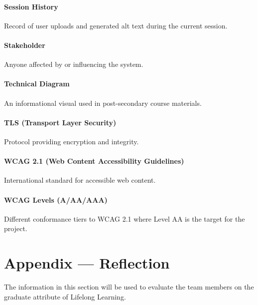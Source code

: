 \documentclass[12pt, titlepage]{article}
\begin{document}
\paragraph*{Session History}
Record of user uploads and generated alt text during the current session.

\paragraph*{Stakeholder}
Anyone affected by or influencing the system.

\paragraph*{Technical Diagram}
An informational visual used in post-secondary course materials.

\paragraph*{TLS (Transport Layer Security)}
Protocol providing encryption and integrity.

\paragraph*{WCAG 2.1 (Web Content Accessibility Guidelines)}
International standard for accessible web content.

\paragraph*{WCAG Levels (A/AA/AAA)}
Different conformance tiers to WCAG 2.1 where Level AA is the target
for the project.

\newpage{}
\section*{Appendix --- Reflection}


The information in this section will be used to evaluate the team members on the
graduate attribute of Lifelong Learning.


\end{document}
